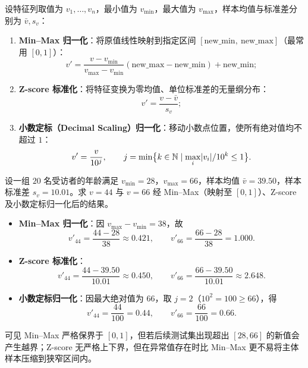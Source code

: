 \begin{definition}[三种经典归一化方法]\label{def:normalization}
设特征列取值为 $v_1, \dots, v_n$，最小值为 $v_{\min}$，最大值为 $v_{\max}$，样本均值与标准差分别为 $\bar{v}, s_v$：
\begin{enumerate}
  \item \textbf{Min–Max 归一化}：将原值线性映射到指定区间 $[\text{new\_min},\ \text{new\_max}]$（最常用 $[0, 1]$）：
  \begin{equation}\label{eq:minmax-norm}
    v' = \frac{v - v_{\min}}{v_{\max} - v_{\min}}(\text{new\_max} - \text{new\_min}) + \text{new\_min};
  \end{equation}
  \item \textbf{Z-score 标准化}：将特征变换为零均值、单位标准差的无量纲分布：
  \begin{equation}\label{eq:zscore-norm}
    v' = \frac{v - \bar{v}}{s_v};
  \end{equation}
  \item \textbf{小数定标（Decimal Scaling）归一化}：移动小数点位置，使所有绝对值均不超过 $1$：
  \begin{equation}\label{eq:decimal-norm}
    v' = \frac{v}{10^j},\qquad j = \min\set[\big]{k\in\N \mid \max_i \abs{v_i}/10^k \le 1}.
  \end{equation}
\end{enumerate}
\end{definition}

\begin{example}[title={年龄特征的三种归一化手算对比}]\label{eg:norm-hand}
设一组 $20$ 名受访者的年龄满足 $v_{\min}=28$，$v_{\max}=66$，样本均值 $\bar{v}=39.50$，样本标准差 $s_v=10.01$。求 $v=44$ 与 $v=66$ 经 Min–Max（映射至 $[0,1]$）、Z-score 及小数定标归一化后的结果。
\begin{solution}
\begin{itemize}
  \item \textbf{Min–Max 归一化}：因 $v_{\max}-v_{\min}=38$，故
  \[
    v'_{44} = \frac{44 - 28}{38} \approx 0.421,\qquad
    v'_{66} = \frac{66 - 28}{38} = 1.000.
  \]
  \item \textbf{Z-score 标准化}：
  \[
    v'_{44} = \frac{44 - 39.50}{10.01} \approx 0.450,\qquad
    v'_{66} = \frac{66 - 39.50}{10.01} \approx 2.648.
  \]
  \item \textbf{小数定标归一化}：因最大绝对值为 $66$，取 $j = 2$（$10^2 = 100 \ge 66$），得
  \[
    v'_{44} = \frac{44}{100} = 0.44,\qquad
    v'_{66} = \frac{66}{100} = 0.66.
  \]
\end{itemize}
可见 Min–Max 严格保界于 $[0,1]$，但若后续测试集出现超出 $[28,66]$ 的新值会产生越界；Z-score 无严格上下界，但在异常值存在时比 Min–Max 更不易将主体样本压缩到狭窄区间内。
\end{solution}
\end{example}

